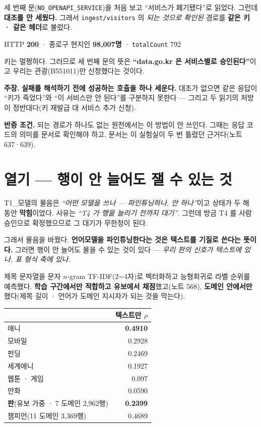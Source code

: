 \documentclass[10pt,a4paper]{article}
\newcommand{\claim}[2]{\begin{claimbox}\textbf{주장.} #1\par\smallskip
  \textcolor{gray!70}{\textbf{반증 조건.} #2}\end{claimbox}}
\begin{document}
세 번째 문(\verb|NO_OPENAPI_SERVICE|)을 처음 보고 ``서비스가 폐기됐다''로 읽었다.
그런데 \textbf{대조를 안 세웠다.} 그래서 \verb|ingest/visitors| 의 \emph{되는 것으로
확인된} 경로를 \textbf{같은 키 · 같은 헤더}로 불렀다.

\begin{center}
HTTP \textbf{200} · 종로구 현지인 \textbf{98{,}007명} · \verb|totalCount| 792
\end{center}

키는 멀쩡하다. 그러므로 세 번째 문의 뜻은 \textbf{``data.go.kr 은 서비스별로
승인된다''}이고 우리는 관광(B551011)만 신청했다는 것이다.

\claim{\textbf{실패를 해석하기 전에 성공하는 호출을 하나 세운다.} 대조가 없으면
같은 응답이 ``키가 죽었다''와 ``이 서비스만 안 된다''를 구분하지 못한다 --- 그리고 두
읽기의 처방이 정반대다(키 재발급 대 서비스 추가 신청).}
{되는 경로가 하나도 없는 원천에서는 이 방법이 안 쓰인다. 그때는 응답 코드의
의미를 문서로 확인해야 하고, 문서는 이 실험실이 두 번 틀렸던 근거다(노트 637·639).}

\section{열기 --- 행이 안 늘어도 잴 수 있는 것}

T1\_모델의 물음은 \emph{``어떤 모델을 쓰나 --- 파인튜닝하나, 안 하나''}이고 상태가 두 해
동안 \textbf{막힘}이었다. 사유는 \emph{``T4 가 행을 늘리기 전까지 대기''}. 그런데
방금 T4 를 사람 승인으로 확정했으므로 그 대기가 무한정이 된다.

그래서 물음을 바꿨다. \textbf{언어모델을 파인튜닝한다는 것은 텍스트를 기질로 쓴다는
뜻이다.} 그러면 행이 안 늘어도 물을 수 있는 것이 있다 --- \emph{우리 판의 신호가
텍스트에 있나, 표 형식 축에 있나.}

제목 문자열을 문자 $n$-gram TF-IDF(2$\sim$4자)로 벡터화하고 능형회귀로 라벨 순위를
예측했다. \textbf{학습 구간에서만 적합하고 유보에서 채점}했고(노트 568), \textbf{도메인
안에서만} 했다(제목 길이 · 언어가 도메인 지시자가 되는 것을 막는다).

\begin{center}
\begin{tabular}{lr}
\toprule
& 텍스트만 $\rho$ \\
\midrule
애니 & \textbf{0.4910} \\
모바일 & 0.2928 \\
펀딩 & 0.2469 \\
세계애니 & 0.1927 \\
웹툰 · 게임 & 0.097 \\
만화 & 0.0590 \\
\midrule
\textbf{판}(유보 가중 · 7 도메인 2{,}962행) & \textbf{0.2399} \\
챔피언(11 도메인 3{,}369행) & 0.4689 \\
\bottomrule
\end{tabular}
\end{center}
\end{document}
